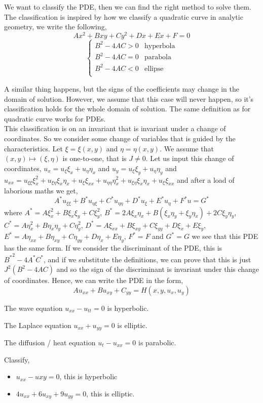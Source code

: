We want to classify the PDE, then we can find the right method to solve them. The classification is inspired by how we classify a quadratic curve in analytic geometry, we write the following,
$$ Ax^2 + Bxy + Cy^2 + Dx + Ex + F = 0 $$
$$ \begin{cases}
  B^2 - 4AC > 0 & \text{hyperbola}\\
  B^2 - 4AC = 0 & \text{parabola} \\
  B^2 - 4AC < 0 & \text{ellipse} \\
\end{cases} $$

\noindent
A similar thing happens, but the signs of the coefficients may change in the domain of solution. However, we assume that this case will never happen, so it's classification holds for the whole domain of solution. The same definition as for quadratic curve works for PDEs. \\

\noindent
This classification is on an invariant that is invariant under a change of coordinates. So we consider some change of variables that is guided by the characteristics. Let $\xi = \xi(x, y)$ and $\eta = \eta(x, y)$. We assume that $(x, y) \mapsto (\xi, \eta)$ is one-to-one, that is $J \ne 0$. Let us input this change of coordinates, $u_x = u_\xi\xi_x + u_\eta\eta_x$ and $u_y = u_\xi\xi_y + u_\eta\eta_y$ and $u_{xx} = u_{\xi\xi}\xi_x^2 + u_{\xi\eta}\xi_x\eta_x + u_\xi\xi_{xx} + u_{\eta\eta}\eta_x^2  + u_{\xi\eta}\xi_x\eta_x + u_\xi\xi_{xx} $
and after a load of laborious maths we get,
$$ A^*u_{\xi\xi} + B^*u_{\eta\xi} + C^*u_{\eta\eta} + D^*u_\xi + E^*u_\eta + F^*u = G^* $$
where $A^* = A\xi_x^2 + B\xi_x\xi_y + C\xi_y^2$, $B^* = 2A\xi_x\eta_x + B(\xi_x\eta_y + \xi_y\eta_x) + 2C\xi_y\eta_y$, $C^* = A\eta_x^2 + B\eta_x\eta_y + C\eta_y^2$, $D^* = A\xi_{xx} + B\xi_{xy} + C\xi_{yy} + D\xi_x + E\xi_y$, $E^* = A\eta_{xx} + B\eta_{xy} + C\eta_{yy} + D\eta_x + E\eta_y$, $F^* = F$ and $G^* = G$
we see that this PDE has the same form. If we consider the discriminant of the PDE, this is ${B^*}^2 - 4A^*C^*$, and if we substitute the definitions, we can prove that this is just $J^2(B^2 - 4AC)$ and so the sign of the discriminant is invariant under this change of coordinates. Hence, we can write the PDE in the form,
$$ Au_{xx} + Bu_{xy} + C_{yy} = H(x, y, u_x, u_y) $$

\begin{eg}
  The wave equation $u_{xx} - u_{tt} = 0$ is hyperbolic.
\end{eg}
\begin{eg}
  The Laplace equation $u_{xx} + u_{yy} = 0$ is elliptic.
\end{eg}
\begin{eg}
  The diffusion / heat equation $u_{t} - u_{xx} = 0$ is parabolic.
\end{eg}
\begin{eg}
  Classify,
  \begin{itemize}
    \item $u_{xx} - u{xy} = 0$, this is hyperbolic
    \item $4u_{xx} + 6u_{xy} + 9u_{yy} = 0$, this is elliptic.
  \end{itemize}
\end{eg}